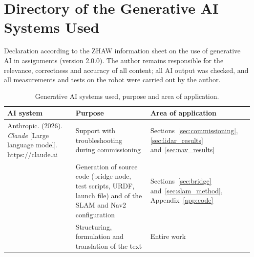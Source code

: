 \chapter{Directory of the Generative AI Systems Used}
\label{app:ai}

Declaration according to the ZHAW information sheet on the use of generative AI in assignments (version 2.0.0). The author remains responsible for the relevance, correctness and accuracy of all content; all AI output was checked, and all measurements and tests on the robot were carried out by the author.


\begin{table}[H]
  \centering
  \small
  \caption{Generative AI systems used, purpose and area of application.}
  \label{tab:ai}
  \begin{tabularx}{\textwidth}{@{}>{\raggedright\arraybackslash}p{4.2cm} X >{\raggedright\arraybackslash}p{3.6cm}@{}}
    \toprule
    \textbf{AI system} & \textbf{Purpose} & \textbf{Area of application} \\
    \midrule
    Anthropic. (2026). \emph{Claude} [Large language model]. https://claude.ai
      & Support with troubleshooting during commissioning
      & Sections~\ref{sec:commissioning}, \ref{sec:lidar_results} and~\ref{sec:nav_results} \\
    & Generation of source code (bridge node, test scripts, URDF, launch file) and of the SLAM and Nav2 configuration
      & Sections~\ref{sec:bridge} and~\ref{sec:slam_method}, Appendix~\ref{app:code} \\
    & Structuring, formulation and translation of the text
      & Entire work \\
    \bottomrule
  \end{tabularx}
\end{table}
